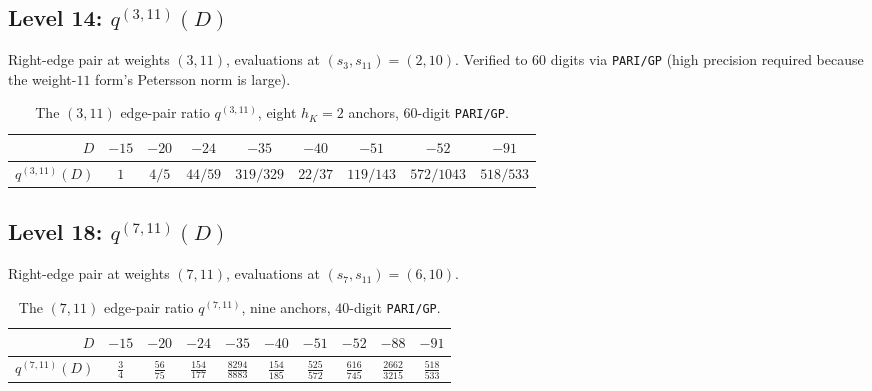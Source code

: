 \documentclass[11pt,a4paper]{amsart}
\theoremstyle{plain}
\theoremstyle{definition}
\newcommand{\qstr}[2]{q^{(#1,#2)}}
\begin{document}
\subsection{Level 14: $\qstr{3}{11}(D)$}\label{ss:lev6}

Right-edge pair at weights $(3, 11)$, evaluations at $(s_3, s_{11}) = (2, 10)$.
Verified to $60$ digits via \texttt{PARI/GP} (high precision required because
the weight-$11$ form's Petersson norm is large).

\begin{table}[h]
\centering
\caption{The $(3,11)$ edge-pair ratio $\qstr{3}{11}$, eight $h_K = 2$ anchors,
$60$-digit \texttt{PARI/GP}.}\label{tab:level6}
\begin{tabular}{rcccccccc}
\toprule
$D$ & $-15$ & $-20$ & $-24$ & $-35$ & $-40$ & $-51$ & $-52$ & $-91$\\
\midrule
$\qstr{3}{11}(D)$
 & $1$ & $4/5$ & $44/59$ & $319/329$ & $22/37$ & $119/143$ & $572/1043$ & $518/533$\\
\bottomrule
\end{tabular}
\end{table}

\subsection{Level 18: $\qstr{7}{11}(D)$}\label{ss:lev7}

Right-edge pair at weights $(7, 11)$, evaluations at $(s_7, s_{11}) = (6, 10)$.

\begin{table}[h]
\centering
\caption{The $(7,11)$ edge-pair ratio $\qstr{7}{11}$, nine anchors,
$40$-digit \texttt{PARI/GP}.}\label{tab:level7}
\setlength{\tabcolsep}{4pt}
\begin{tabular}{rccccccccc}
\toprule
$D$ & $-15$ & $-20$ & $-24$ & $-35$ & $-40$ & $-51$ & $-52$ & $-88$ & $-91$\\
\midrule
$\qstr{7}{11}(D)$
 & $\tfrac{3}{4}$ & $\tfrac{56}{75}$ & $\tfrac{154}{177}$ & $\tfrac{8294}{8883}$
 & $\tfrac{154}{185}$ & $\tfrac{525}{572}$ & $\tfrac{616}{745}$
 & $\tfrac{2662}{3215}$ & $\tfrac{518}{533}$\\
\bottomrule
\end{tabular}
\end{table}
\end{document}
